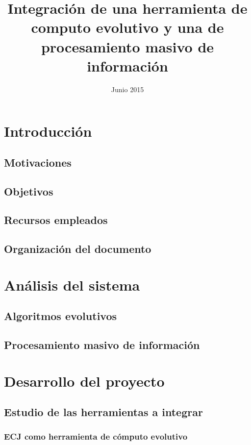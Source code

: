 \documentclass{estilos-y-libreria}
\title{Integración de una herramienta de computo evolutivo y una de procesamiento masivo de informaci\'on}
\date{Junio 2015}
\begin{document}
\frontmatter
\hacerportada
\hacercontraportada
\newpage{\ }
\thispagestyle{empty} 
\hacerprologo
\haceragradecimientos
\setcounter{secnumdepth}{2}
\setcounter{tocdepth}{2}
\tableofcontents
\listoffigures
\listoftables

\mainmatter

\chapter{Introducci\'on}
	\section{Motivaciones\label{motivaciones}}
		
	\section{Objetivos}
	\section{Recursos empleados}
	\section{Organizaci\'on del documento}

\chapter{An\'alisis del sistema}
	
	\section{Algoritmos evolutivos}
		
	\section{Procesamiento masivo de informaci\'on}
		

\chapter{Desarrollo del proyecto}
	\section{Estudio de las herramientas a integrar}
		\subsection{ECJ como herramienta de c\'omputo evolutivo\label{desarrollo-ecj}}
\end{document}
